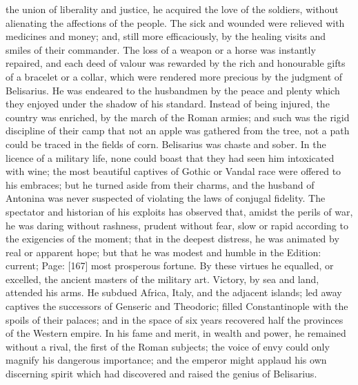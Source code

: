 the union of liberality and justice, he acquired the love of the soldiers, without alienating the affections of the people. The sick and wounded were relieved with medicines and money; and, still more efficaciously, by the healing visits and smiles of their commander. The loss of a weapon or a horse was instantly repaired, and each deed of valour was rewarded by the rich and honourable gifts of a bracelet or a collar, which were rendered more precious by the judgment of Belisarius. He was endeared to the husbandmen by the peace and plenty which they enjoyed under the shadow of his standard. Instead of being injured, the country was enriched, by the march of the Roman armies; and such was the rigid discipline of their camp that not an apple was gathered from the tree, not a path could be traced in the fields of corn. Belisarius was chaste and sober. In the licence of a military life, none could boast that they had seen him intoxicated with wine; the most beautiful captives of Gothic or Vandal race were offered to his embraces; but he turned aside from their charms, and the husband of Antonina was never suspected of violating the laws of conjugal fidelity. The spectator and historian of his exploits has observed that, amidst the perils of war, he was daring without rashness, prudent without fear, slow or rapid according to the exigencies of the moment; that in the deepest distress, he was animated by real or apparent hope; but that he was modest and humble in the Edition: current; Page: [167] most prosperous fortune. By these virtues he equalled, or excelled, the ancient masters of the military art. Victory, by sea and land, attended his arms. He subdued Africa, Italy, and the adjacent islands; led away captives the successors of Genseric and Theodoric; filled Constantinople with the spoils of their palaces; and in the space of six years recovered half the provinces of the Western empire. In his fame and merit, in wealth and power, he remained without a rival, the first of the Roman subjects; the voice of envy could only magnify his dangerous importance; and the emperor might applaud his own discerning spirit which had discovered and raised the genius of Belisarius.

